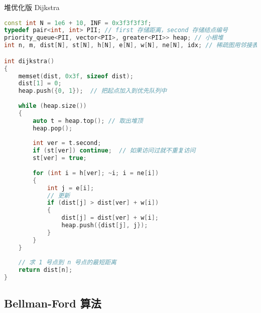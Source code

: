 堆优化版 Dijkstra

\begin{lstlisting}[language=cpp]
const int N = 1e6 + 10, INF = 0x3f3f3f3f;
typedef pair<int, int> PII; // first 存储距离，second 存储结点编号
priority_queue<PII, vector<PII>, greater<PII>> heap; // 小根堆
int n, m, dist[N], st[N], h[N], e[N], w[N], ne[N], idx; // 稀疏图用邻接表存图

int dijkstra()
{
    memset(dist, 0x3f, sizeof dist);
    dist[1] = 0;
    heap.push({0, 1});  // 把起点加入到优先队列中
    
    while (heap.size())
    {
        auto t = heap.top(); // 取出堆顶
        heap.pop();
        
        int ver = t.second;
        if (st[ver]) continue;  // 如果访问过就不重复访问
        st[ver] = true;
        
        for (int i = h[ver]; ~i; i = ne[i])
        {
            int j = e[i];
            // 更新
            if (dist[j] > dist[ver] + w[i])
            {
                dist[j] = dist[ver] + w[i];
                heap.push({dist[j], j});
            }
        }
    }
    
    // 求 1 号点到 n 号点的最短距离
    return dist[n];
}
\end{lstlisting}

\subsection{Bellman-Ford 算法}

